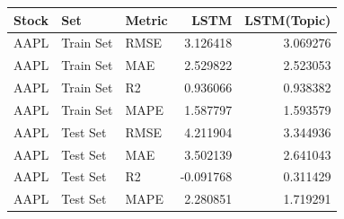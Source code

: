 \begin{tabular}{lllrr}
\toprule
Stock & Set & Metric & LSTM & LSTM(Topic) \\
\midrule
AAPL & Train Set & RMSE & 3.126418 & 3.069276 \\
AAPL & Train Set & MAE & 2.529822 & 2.523053 \\
AAPL & Train Set & R2 & 0.936066 & 0.938382 \\
AAPL & Train Set & MAPE & 1.587797 & 1.593579 \\
AAPL & Test Set & RMSE & 4.211904 & 3.344936 \\
AAPL & Test Set & MAE & 3.502139 & 2.641043 \\
AAPL & Test Set & R2 & -0.091768 & 0.311429 \\
AAPL & Test Set & MAPE & 2.280851 & 1.719291 \\
\bottomrule
\end{tabular}
